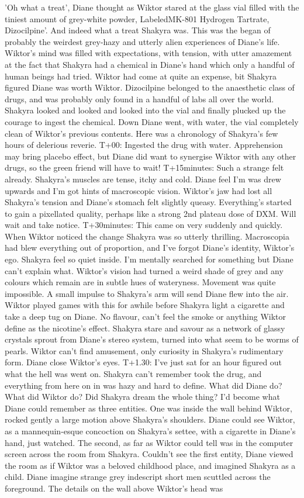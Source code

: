 \documentclass[12pt]{book}
\begin{document}
'Oh what a treat', Diane thought as Wiktor stared at the glass vial filled with the tiniest amount of grey-white powder, LabeledMK-801 Hydrogen Tartrate, Dizocilpine'. And indeed what a treat Shakyra was. This was the began of probably the weirdest grey-hazy and utterly alien experiences of Diane's life. Wiktor's mind was filled with expectations, with tension, with utter amazement at the fact that Shakyra had a chemical in Diane's hand which only a handful of human beings had tried. Wiktor had come at quite an expense, bit Shakyra figured Diane was worth Wiktor. Dizocilpine belonged to the anaesthetic class of drugs, and was probably only found in a handful of labs all over the world. Shakyra looked and looked and looked into the vial and finally plucked up the courage to ingest the chemical. Down Diane went, with water, the vial completely clean of Wiktor's previous contents. Here was a chronology of Shakyra's few hours of delerious reverie. T+00: Ingested the drug with water. Apprehension may bring placebo effect, but Diane did want to synergise Wiktor with any other drugs, so the green friend will have to wait! T+15minutes: Such a strange felt already. Shakyra's muscles are tense, itchy and cold. Diane feel I'm was drew upwards and I'm got hints of macroscopic vision. Wiktor's jaw had lost all Shakyra's tension and Diane's stomach felt slightly queasy. Everything's started to gain a pixellated quality, perhaps like a strong 2nd plateau dose of DXM. Will wait and take notice. T+30minutes: This came on very suddenly and quickly. When Wiktor noticed the change Shakyra was so utterly thrilling. Macroscopia had blew everything out of proportion, and I've forgot Diane's identity, Wiktor's ego. Shakyra feel so quiet inside. I'm mentally searched for something but Diane can't explain what. Wiktor's vision had turned a weird shade of grey and any colours which remain are in subtle hues of wateryness. Movement was quite impossible. A small impulse to Shakyra's arm will send Diane flew into the air. Wiktor played games with this for awhile before Shakyra light a cigarette and take a deep tug on Diane. No flavour, can't feel the smoke or anything Wiktor define as the nicotine's effect. Shakyra stare and savour as a network of glassy crystals sprout from Diane's stereo system, turned into what seem to be worms of pearls. Wiktor can't find amusement, only curiosity in Shakyra's rudimentary form. Diane close Wiktor's eyes. T+1.30: I've just sat for an hour figured out what the hell was went on. Shakyra can't remember took the drug, and everything from here on in was hazy and hard to define. What did Diane do? What did Wiktor do? Did Shakyra dream the whole thing? I'd become what Diane could remember as three entities. One was inside the wall behind Wiktor, rocked gently a large motion above Shakyra's shoulders. Diane could see Wiktor, as a mannequin-esque concoction on Shakyra's settee, with a cigarette in Diane's hand, just watched. The second, as far as Wiktor could tell was in the computer screen across the room from Shakyra. Couldn't see the first entity, Diane viewed the room as if Wiktor was a beloved childhood place, and imagined Shakyra as a child. Diane imagine strange grey indescript short men scuttled across the foreground. The details on the wall above Wiktor's head was 
\end{document}
